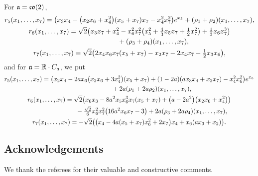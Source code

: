 \documentclass[pdftex]{sigma}
\numberwithin{equation}{section}
\newcommand\fa{{\frak a}}
\newcommand{\fco}{\mathop{{\frak c \frak o}}}
\newcommand\RR{{\mathbb R}}
\begin{document}
For $\fa=\fco(2)$,
\begin{gather*}
r_5(x_1,\dots, x_7) = \big(x_3x_4-\big(x_2x_6+x_4^2\big)(x_5+x_7)x_7-x_4^2x_7^2\big)e^{x_5} +(\rho_1+\rho_2)(x_1,\dots,x_7),\\
r_6(x_1,\dots, x_7) = \sqrt2\big(x_3x_7+x_4^2-x_6^2x_7^2\big(x_5^2+\tfrac43 x_5x_7+\tfrac12x_7^2\big)+\tfrac13x_6x_7^3\big) \\
\hphantom{r_6(x_1,\dots, x_7) =}{} +(\rho_3+\rho_4)(x_1,\dots,x_7) ,\\
r_7(x_1,\dots, x_7) = \sqrt2\big(2x_4x_6x_7(x_5+x_7)-x_2x_7-2x_4x_7-\tfrac12 x_3x_6\big),
\end{gather*}
and for $\fa=\RR\cdot C_a$, we put
\begin{gather*}
r_5(x_1,\dots, x_7) = \big(x_2x_4-2ax_6\big(x_2x_6+3x_4^2\big)(x_5+x_7)+(1 - 2a)(ax_3x_4+x_2x_7)-x_4^2x_6^2\big)e^{x_5} \\
 \hphantom{r_5(x_1,\dots, x_7) =}{} +2a(\rho_1+2a\rho_2)(x_1,\dots, x_7),\\
r_6(x_1,\dots, x_7) = \sqrt2\big(x_6x_3-8a^2x_5x_6^3x_7(x_5+x_7)+\big(a-2a^2\big)\big(x_2x_6+x_4^2\big)\big) \\
 \hphantom{r_6(x_1,\dots, x_7) =}{} -\tfrac{\sqrt2}6x_6^2x_7^2\big(16a^2x_6x_7-3\big) +2a(\rho_3+2a\rho_4)(x_1,\dots, x_7),\\
r_7(x_1,\dots, x_7) = -\sqrt 2\big(\big(x_4-4a(x_5+x_7)x_6^2+2x_7\big)x_4+x_6(ax_3+x_2)\big).
\end{gather*}

\subsection*{Acknowledgements} We thank the referees for their valuable and constructive comments.
\end{document}
